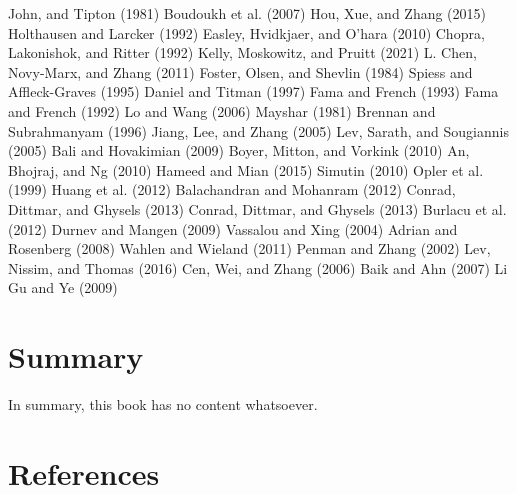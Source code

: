 \documentclass[
  letterpaper,
  DIV=11,
  numbers=noendperiod]{scrreprt}
\begin{document}
John, and Tipton (1981) Boudoukh et al. (2007) Hou, Xue, and Zhang
(2015) Holthausen and Larcker (1992) Easley, Hvidkjaer, and O'hara
(2010) Chopra, Lakonishok, and Ritter (1992) Kelly, Moskowitz, and
Pruitt (2021) L. Chen, Novy-Marx, and Zhang (2011) Foster, Olsen, and
Shevlin (1984) Spiess and Affleck-Graves (1995) Daniel and Titman (1997)
Fama and French (1993) Fama and French (1992) Lo and Wang (2006) Mayshar
(1981) Brennan and Subrahmanyam (1996) Jiang, Lee, and Zhang (2005) Lev,
Sarath, and Sougiannis (2005) Bali and Hovakimian (2009) Boyer, Mitton,
and Vorkink (2010) An, Bhojraj, and Ng (2010) Hameed and Mian (2015)
Simutin (2010) Opler et al. (1999) Huang et al. (2012) Balachandran and
Mohanram (2012) Conrad, Dittmar, and Ghysels (2013) Conrad, Dittmar, and
Ghysels (2013) Burlacu et al. (2012) Durnev and Mangen (2009) Vassalou
and Xing (2004) Adrian and Rosenberg (2008) Wahlen and Wieland (2011)
Penman and Zhang (2002) Lev, Nissim, and Thomas (2016) Cen, Wei, and
Zhang (2006) Baik and Ahn (2007) Li Gu and Ye (2009)


\hypertarget{summary}{%
\chapter{Summary}\label{summary}}

In summary, this book has no content whatsoever.


\hypertarget{references}{%
\chapter*{References}\label{references}}

\end{document}
